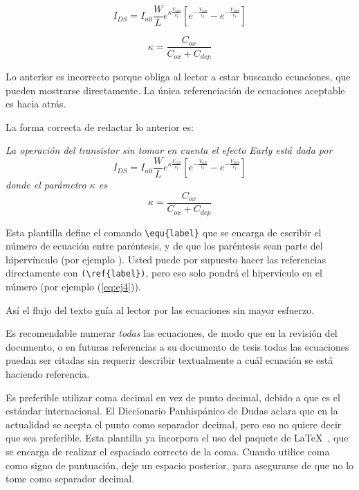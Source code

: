 \begin{equation} \label{eq:ej1}
  I_{DS}
  =
  I_{n0} \frac{W}{L}e^{\kappa \frac{V_{GB}}{v_t}}
  \left[
    e^{-\frac{V_{SB}}{v_t}}
    -
    e^{-\frac{V_{DB}}{v_t}}
  \right]
\end{equation}

\begin{equation} \label{eq:ej2}
  \kappa = \frac{C_{ox}}{C_{ox}+C_{dep}}
\end{equation}

Lo anterior es incorrecto porque obliga al lector a estar buscando
ecuaciones, que pueden mostrarse directamente.  La única
referenciación de ecuaciones aceptable es hacia atrás.

La forma correcta de redactar lo anterior es: 

\textsl{La operación del transistor sin tomar en cuenta el efecto Early está
  dada por}
\begin{equation} \label{eq:ej3}
  I_{DS}
  =
  I_{n0} \frac{W}{L}e^{\kappa \frac{V_{GB}}{v_t}}
  \left[
    e^{-\frac{V_{SB}}{v_t}}
    -
    e^{-\frac{V_{DB}}{v_t}}
  \right]
\end{equation}
\textsl{donde el parámetro $\kappa$ es}
\begin{equation} \label{eq:ej4}
  \kappa = \frac{C_{ox}}{C_{ox}+C_{dep}}
\end{equation}

Esta plantilla define el comando \verb+\equ{label}+ que se encarga de
escribir el número de ecuación entre paréntesis, y de que los
paréntesis sean parte del hipervínculo (por ejemplo ).
%
Usted puede por supuesto hacer las referencias directamente con
\verb+(\ref{label})+, pero eso solo pondrá el hipervículo en el
número (por ejemplo (\ref{eq:ej4})).

Así el flujo del texto guía al lector por las ecuaciones sin mayor esfuerzo.

Es recomendable numerar \emph{todas} las ecuaciones, de modo que en la revisión
del documento, o en futuras referencias a su documento de tesis todas las
ecuaciones puedan ser citadas sin requerir describir textualmente a cuál
ecuación se está haciendo referencia.

Es preferible utilizar coma decimal en vez de punto decimal, debido a
que es el estándar internacional.  El Diccionario Panhispánico de
Dudas aclara que en la actualidad se acepta el punto como separador
decimal, pero eso no quiere decir que sea preferible.  Esta plantilla
ya incorpora el uso del paquete de \LaTeX\ , que se
encarga de realizar el espaciado correcto de la coma.  Cuando utilice
coma como signo de puntuación, deje un espacio posterior, para
asegurarse de que  no lo tome como separador decimal.

